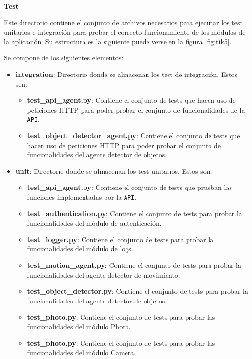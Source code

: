 \textbf{Test}

Este directorio contiene el conjunto de archivos necesarios para ejecutar los test unitarios e integración para probar el correcto funcionamiento de los módulos de la aplicación. Su estructura es la siguiente puede verse en la figura \ref{fig:tik5}.

Se compone de los siguientes elementos:

\vspace{-0.5cm}

\begin{itemize}
\item \textbf{integration}: Directorio donde se almacenan los test de integración. Estos son:

	\begin{itemize}
	\item \textbf{test\_api\_agent.py}: Contiene el conjunto de tests que hacen uso de peticiones HTTP para poder probar el conjunto de funcionalidades de la \texttt{API}.
	\item \textbf{test\_object\_detector\_agent.py}: Contiene el conjunto de tests que hacen uso de peticiones HTTP para poder probar el conjunto de funcionalidades del agente detector de objetos.
	\end{itemize}

\item \textbf{unit}: Directorio donde se almacenan los test unitarios. Estos son:

	\begin{itemize}
	\item \textbf{test\_api\_agent.py}: Contiene el conjunto de tests que prueban las funciones implementadas por la \texttt{API}.
	\item \textbf{test\_authentication.py}: Contiene el conjunto de tests para probar la funcionalidades del módulo de autenticación.
	\item \textbf{test\_logger.py}: Contiene el conjunto de tests para probar la funcionalidades del módulo de logs.
	\item \textbf{test\_motion\_agent.py}: Contiene el conjunto de tests para probar la funcionalidades del agente detector de movimiento.
	\item \textbf{test\_object\_detector.py}: Contiene el conjunto de tests para probar la funcionalidades del agente detector de objetos.
	\item \textbf{test\_photo.py}: Contiene el conjunto de tests para probar las funcionalidades del módulo Photo.
	\item \textbf{test\_photo.py}: Contiene el conjunto de tests para probar las funcionalidades del módulo Camera.
	\end{itemize}


\end{itemize}
